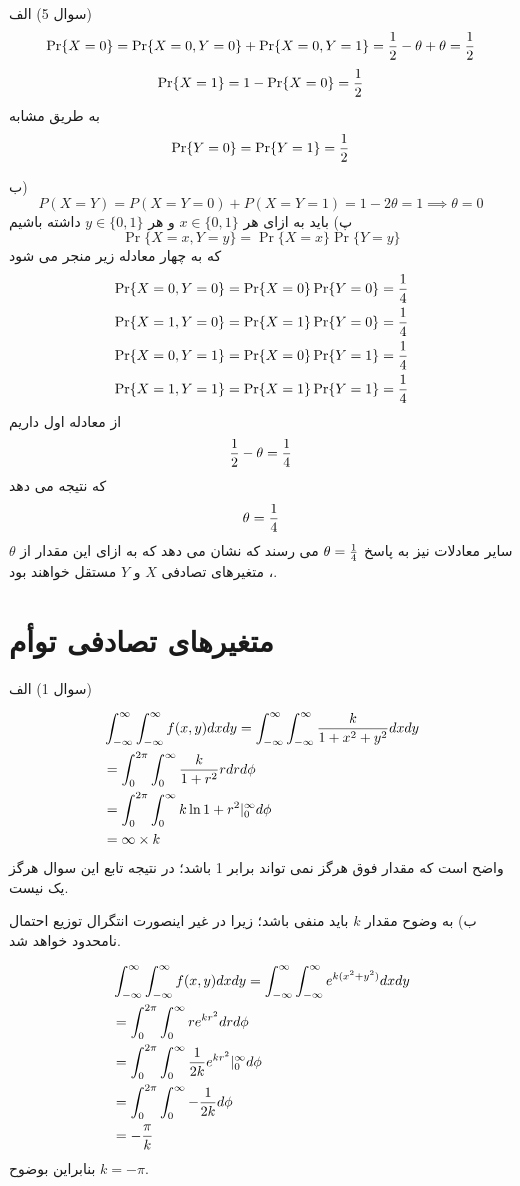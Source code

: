 \documentclass[10pt,letterpaper]{report}
\newcommand{\eqn}[1]{
\[\begin{split}
#1
\end{split}\]
}
\begin{document}
سوال 5) الف) 
$$
\Pr\{X=0\}=\Pr\{X=0,Y=0\}+\Pr\{X=0,Y=1\}={1\over 2}-\theta+\theta={1\over 2}
$$
$$
\Pr\{X=1\}=1-\Pr\{X=0\}={1\over 2}
$$
به طریق مشابه
$$
\Pr\{Y=0\}=\Pr\{Y=1\}={1\over 2}
$$

ب)
$$
P(X=Y)=P(X=Y=0)+P(X=Y=1)=1-2\theta=1\implies \theta=0
$$
پ) باید به ازای هر 
$
x\in\{0,1\}
$
و هر 
$
y\in\{0,1\}
$
داشته باشیم
$$
\Pr\{X=x,Y=y\}=\Pr\{X=x\}\Pr\{Y=y\}
$$
که به چهار معادله زیر منجر می شود
\begin{equation}
\begin{split}
&\Pr\{X=0,Y=0\}=\Pr\{X=0\}\Pr\{Y=0\}={1\over 4}
\\&\Pr\{X=1,Y=0\}=\Pr\{X=1\}\Pr\{Y=0\}={1\over 4}
\\&\Pr\{X=0,Y=1\}=\Pr\{X=0\}\Pr\{Y=1\}={1\over 4}
\\&\Pr\{X=1,Y=1\}=\Pr\{X=1\}\Pr\{Y=1\}={1\over 4}
\end{split}
\end{equation}
از معادله اول داریم
$$
{1\over 2}-\theta={1\over 4}
$$
که نتیجه می دهد
$$
\theta={1\over 4}
$$
سایر معادلات نیز به پاسخ $
\theta={1\over 4}
$
می رسند که نشان می دهد که به ازای این مقدار از 
$
\theta
$
، متغیرهای تصادفی 
$
X
$
و
$
Y
$
مستقل خواهند بود.

\chapter{متغیرهای تصادفی توأم}

سوال 1) الف)
\eqn{
&\int_{-\infty}^{\infty}\int_{-\infty}^{\infty}f(x,y)dxdy=
\int_{-\infty}^{\infty}\int_{-\infty}^{\infty}{k\over 1+x^2+y^2}dxdy
\\&=
\int_{0}^{2\pi}\int_{0}^{\infty}{k\over 1+r^2}rdrd\phi
\\&=
\int_{0}^{2\pi}\int_{0}^{\infty}k\ln 1+r^2|_0^\infty d\phi
\\&=\infty\times k
}{}
واضح است که مقدار فوق هرگز نمی تواند برابر 1 باشد؛ در نتیجه تابع این سوال هرگز یک  نیست.

ب) به وضوح مقدار $k$ باید منفی باشد؛ زیرا در غیر اینصورت انتگرال توزیع احتمال نامحدود خواهد شد.
\eqn{
&\int_{-\infty}^{\infty}\int_{-\infty}^{\infty}f(x,y)dxdy=
\int_{-\infty}^{\infty}\int_{-\infty}^{\infty}e^{k(x^2+y^2)}dxdy
\\&=
\int_{0}^{2\pi}\int_{0}^{\infty}re^{kr^2}drd\phi
\\&=
\int_{0}^{2\pi}\int_{0}^{\infty}{1\over 2k}e^{kr^2}|_0^\infty d\phi
\\&=
\int_{0}^{2\pi}\int_{0}^{\infty}-{1\over 2k} d\phi
\\&=-{\pi\over k}
}{}
بنابراین بوضوح $k=-\pi$.
\end{document}
